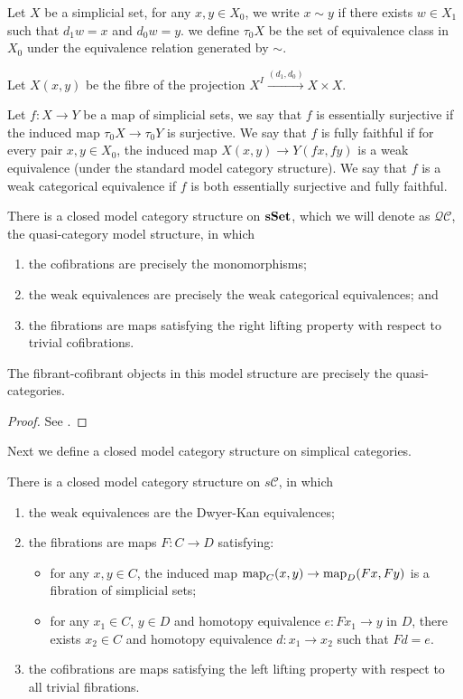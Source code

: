 \begin{refsection}
\begin{defin}
Let $X$ be a simplicial set, for any $x,y\in X_0$, we write $x\sim y$ if there exists $w\in X_1$ such that $d_1w=x$ and $d_0w=y$. we define $\tau_0X$ be the set of equivalence class in $X_0$ under the equivalence relation generated by $\sim$.

Let $X(x,y)$ be the fibre of the projection $X^I\xrightarrow{(d_1,d_0)} X\times X$.

Let $f:X\to Y$ be a map of simplicial sets, we say that $f$ is essentially surjective if the induced map $\tau_0X\to\tau_0Y$ is surjective. We say that $f$ is fully faithful if for every pair $x,y\in X_0$, the induced map $X(x,y)\to Y(fx,fy)$ is a weak equivalence (under the standard model category structure). We say that $f$ is a weak categorical equivalence if $f$ is both essentially surjective and fully faithful.
\end{defin}
\begin{thm}
There is a closed model category structure on $\mathbf{sSet}$, which we will denote as $\mathcal{QC}$, the quasi-category model structure, in which
\begin{enumerate}
\item the cofibrations are precisely the monomorphisms;
\item the weak equivalences are precisely the weak categorical equivalences; and
\item the fibrations are maps satisfying the right lifting property with respect to trivial cofibrations.
\end{enumerate}
The fibrant-cofibrant objects in this model structure are precisely the quasi-categories.
\end{thm}

\begin{proof}
See \cite{joyal2}.
\end{proof}

Next we define a closed model category structure on simplical categories.
\begin{thm}
There is a closed model category structure on $s\mathcal{C}$, in which
\begin{enumerate}
\item the weak equivalences are the Dwyer-Kan equivalences;
\item the fibrations are maps $F:C\to D$ satisfying:
\begin{itemize}
\item for any $x,y\in C$, the induced map $\operatorname{\mathrm{map}}_C(x,y)\to\operatorname{\mathrm{map}}_D(Fx,Fy)$ is a fibration of simplicial sets;
\item for any $x_1\in C$, $y\in D$ and homotopy equivalence $e:Fx_1\to y$ in $D$, there exists $x_2\in C$ and homotopy equivalence $d:x_1\to x_2$ such that $Fd=e$.
\end{itemize}
\item the cofibrations are maps satisfying the left lifting property with respect to all trivial fibrations.
\end{enumerate}
\end{thm}


\end{refsection}
